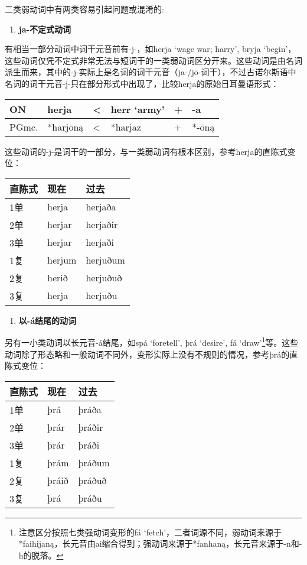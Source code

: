 二类弱动词中有两类容易引起问题或混淆的:

\begin{enumerate}
\def\labelenumi{\arabic{enumi})}
\item
  \textbf{ja-不定式动词}
\end{enumerate}

有相当一部分动词中词干元音前有-j-，如herja `wage war; harry', bryja
`begin'，这些动词仅凭不定式非常无法与短词干的一类弱动词区分开来。这些动词是由名词派生而来，其中的-j-实际上是名词的词干元音（ja-/jō-词干），不过古诺尔斯语中名词的词干元音-j-只在部分形式中出现了，比较herja的原始日耳曼语形式：

\begin{longtable}{llllll}
\toprule
ON & herja & \textless{} & herr `army' & + & -a \\
\midrule
\endhead
\bottomrule
\endfoot
PGmc. & *harjōną & \textless{} & *harjaz & + & *-ōną \\
\end{longtable}

这些动词的-j-是词干的一部分，与一类弱动词有根本区别，参考herja的直陈式变位：

\begin{longtable}{lll}
\toprule
直陈式 & 现在 & 过去 \\
\midrule
\endhead
\bottomrule
\endfoot
1单 & herja & herjaða \\
2单 & herjar & herjaðir \\
3单 & herjar & herjaði \\
1复 & herjum & herjuðum \\
2复 & herið & herjuðuð \\
3复 & herja & herjuðu \\
\end{longtable}

\begin{enumerate}
\def\labelenumi{\arabic{enumi})}
\setcounter{enumi}{1}
\item
  \textbf{以-á结尾的动词}
\end{enumerate}

另有一小类动词以长元音-á结尾，如spá `foretell', þrá `desire', fá
`draw'\footnote{注意区分按照七类强动词变形的fá
  `fetch'，二者词源不同，弱动词来源于*faihijaną，长元音由ai缩合得到；强动词来源于*fanhaną，长元音来源于-n和-h的脱落。}等。这些动词除了形态略和一般动词不同外，变形实际上没有不规则的情况，参考þrá的直陈式变位：

\begin{longtable}{lll}
\toprule
直陈式 & 现在 & 过去 \\
\midrule
\endhead
\bottomrule
\endfoot
1单 & þrá & þráða \\
2单 & þrár & þráðir \\
3单 & þrár & þráði \\
1复 & þrám & þráðum \\
2复 & þráið & þráðuð \\
3复 & þrá & þráðu \\
\end{longtable}

